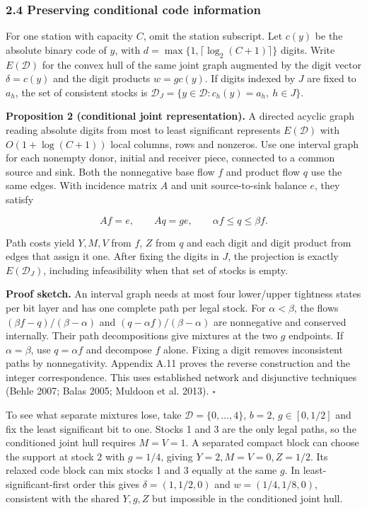 \documentclass[
  american,
  11pt,
]{article}
\newcounter{none} %
\begin{document}
\subsubsection{2.4 Preserving conditional code
information}\label{preserving-conditional-code-information}

For one station with capacity \(C\), omit the station subscript. Let
\(c(y)\) be the absolute binary code of \(y\), with
\(d=\max\{1,\lceil\log_2(C+1)\rceil\}\) digits. Write \(E(\mathcal D)\)
for the convex hull of the same joint graph augmented by the digit
vector \(\delta=c(y)\) and the digit products \(w=gc(y)\). If digits
indexed by \(J\) are fixed to \(a_h\), the set of consistent stocks is
\(\mathcal D_J=\{y\in\mathcal D:c_h(y)=a_h,\ h\in J\}\).


\textbf{Proposition 2 (conditional joint representation).} A directed
acyclic graph reading absolute digits from most to least significant
represents \(E(\mathcal D)\) with \(O(1+\log(C+1))\) local columns, rows
and nonzeros. Use one interval graph for each nonempty donor, initial
and receiver piece, connected to a common source and sink. Both the
nonnegative base flow \(f\) and product flow \(q\) use the same edges.
With incidence matrix \(A\) and unit source-to-sink balance \(e\), they
satisfy

\[
Af=e,\qquad Aq=ge,\qquad \alpha f\le q\le\beta f.
\]

Path costs yield \(Y,M,V\) from \(f\), \(Z\) from \(q\) and each digit
and digit product from edges that assign it one. After fixing the digits
in \(J\), the projection is exactly \(E(\mathcal D_J)\), including
infeasibility when that set of stocks is empty.

\textbf{Proof sketch.} An interval graph needs at most four lower/upper
tightness states per bit layer and has one complete path per legal
stock. For \(\alpha<\beta\), the flows \((\beta f-q)/(\beta-\alpha)\)
and \((q-\alpha f)/(\beta-\alpha)\) are nonnegative and conserved
internally. Their path decompositions give mixtures at the two \(g\)
endpoints. If \(\alpha=\beta\), use \(q=\alpha f\) and decompose \(f\)
alone. Fixing a digit removes inconsistent paths by nonnegativity.
Appendix A.11 proves the reverse construction and the integer
correspondence. This uses established network and disjunctive techniques
(Behle 2007; Balas 2005; Muldoon et al. 2013). \(\square\)

To see what separate mixtures lose, take \(\mathcal D=\{0,\ldots,4\}\),
\(b=2\), \(g\in[0,1/2]\) and fix the least significant bit to one.
Stocks 1 and 3 are the only legal paths, so the conditioned joint hull
requires \(M=V=1\). A separated compact block can choose the support at
stock 2 with \(g=1/4\), giving \(Y=2,M=V=0,Z=1/2\). Its relaxed code
block can mix stocks 1 and 3 equally at the same \(g\). In
least-significant-first order this gives \(\delta=(1,1/2,0)\) and
\(w=(1/4,1/8,0)\), consistent with the shared \(Y,g,Z\) but impossible
in the conditioned joint hull.
\end{document}
